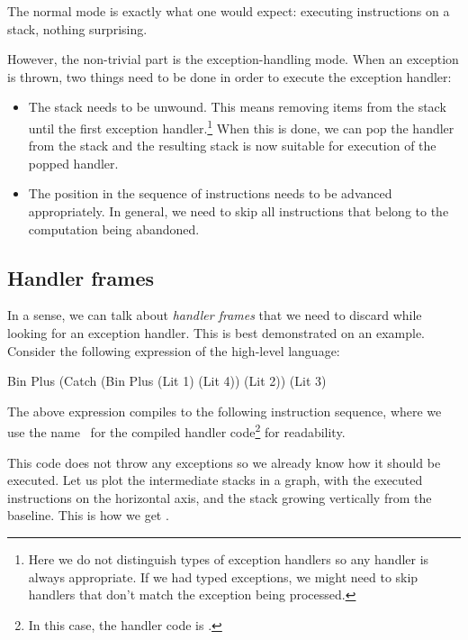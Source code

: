The normal mode is exactly what one would expect: executing instructions on a stack, nothing surprising.

However, the non-trivial part is the exception-handling mode. When an exception is thrown,
two things need to be done in order to execute the exception handler: \label{sec:stack-unwinding}
\begin{itemize}
	\item The stack needs to be unwound. This means removing items from the stack
		until the first exception handler.\footnote{Here we do not distinguish types
		of exception handlers so any handler is always appropriate. If we had typed
		exceptions, we might need to skip handlers that don't match the exception
		being processed.} When this is done, we can pop the handler from the stack
		and the resulting stack is now suitable for execution of the popped handler.
	\item The position in the sequence of instructions needs to be advanced
		appropriately. In general, we need to skip all instructions that belong
		to the computation being abandoned.
\end{itemize}

\subsection{Handler frames}
In a sense, we can talk about \emph{handler frames} that we need to discard
while looking for an exception handler. This is best demonstrated on an example.
Consider the following expression of the high-level language:
\begin{code}
  Bin Plus
  	(Catch
  		(Bin Plus (Lit 1) (Lit 4))
  		(Lit 2))
  	(Lit 3)
\end{code}
The above expression compiles to the following instruction sequence, where we use
the name~ for the compiled handler code\footnote{In this case, the handler
code is \ident{[PUSH 2]}.} for readability.
\begin{code}
\end{code}
This code does not throw any exceptions so we already know how it should be executed.
Let us plot the intermediate stacks in a graph, with the executed instructions
on the horizontal axis, and the stack growing vertically from the baseline. This is
how we get .

